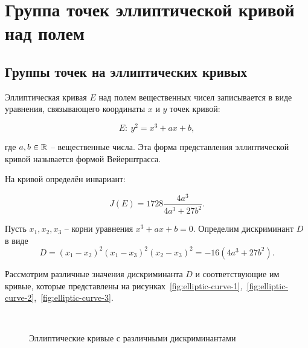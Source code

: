 \section{Группа точек эллиптической кривой над полем}\label{section-math-ec-groups}

\subsection{Группы точек на эллиптических кривых}

Эллиптическая кривая $E$ над полем вещественных чисел записывается в виде уравнения, связывающего координаты $x$ и $y$ точек кривой:

\begin{equation}
    E: ~ y^{2} = x^{3} + ax + b,
    \label{Wer}
\end{equation}

где $a,b \in \mathbb{R}$ -- вещественные числа. Эта форма представления эллиптической кривой называется формой Вейерштрасса.

На кривой определён инвариант:

\begin{equation}
    J(E)=1728\frac{4a^{3} }{4a^{3} +27b^{2} }.
\end{equation}

Пусть $x_{1} ,x_{2} ,x_{3} $ -- корни уравнения $x^3 + a x + b = 0$. Определим дискриминант $D$ в виде
    \[ D =(x_1 - x_2)^2 (x_1 - x_3)^2 (x_2 - x_3)^2 = - 16(4 a^3 + 27 b^2). \]

Рассмотрим различные значения дискриминанта $D$ и соответствующие им кривые, которые представлены на рисунках~\ref{fig:elliptic-curve-1},~\ref{fig:elliptic-curve-2},~\ref{fig:elliptic-curve-3}.

\begin{figure}[thb]
	\centering
	~~~~
	~~~~
	\caption{Эллиптические кривые с различными дискриминантами}
\end{figure}

